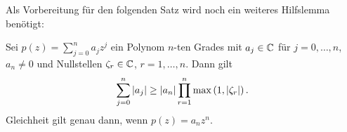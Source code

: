 Als Vorbereitung für den folgenden Satz wird noch ein weiteres Hilfslemma benötigt:

\begin{lemma}
    \label{lemma:polynom_coefficient_sum_inequality}
    Sei $p(z) = \sum_{j = 0}^{n} a_j z^j$ ein Polynom $n$-ten Grades mit
    $a_j \in \mathbb{C}$ für $j = 0, \dots, n$, $a_n \neq 0$ und Nullstellen
    $\zeta_r \in \mathbb{C}$, $r = 1, \dots, n$.
    Dann gilt
    \begin{equation}
        \label{eq:polynom_coefficient_sum_inequality}
        \sum_{j=0}^{n} \left\lvert a_j \right\rvert \geq \left\lvert a_n \right\rvert \prod_{r=1}^{n} \max \left(1, \left\lvert \zeta_r \right\rvert \right).
    \end{equation}
    Gleichheit gilt genau dann, wenn $p(z) = a_n z^n$.
\end{lemma}

